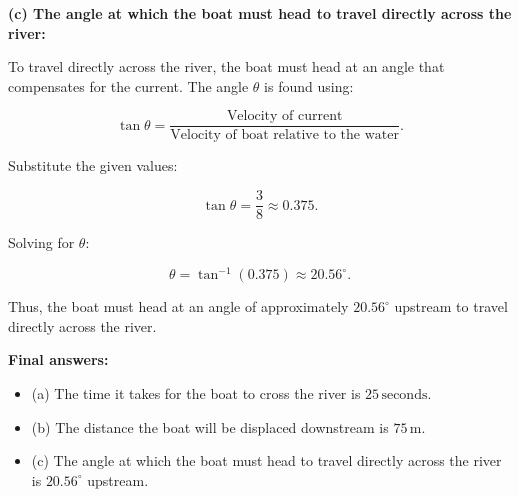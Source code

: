 \documentclass[addpoints]{exam}
\begin{document}
\begin{questions}
\begin{solution}[5cm]
\textbf{(c) The angle at which the boat must head to travel directly across the river:}

To travel directly across the river, the boat must head at an angle that compensates for the current. The angle \( \theta \) is found using:

\[
\tan \theta = \frac{\text{Velocity of current}}{\text{Velocity of boat relative to the water}}.
\]

Substitute the given values:

\[
\tan \theta = \frac{3}{8} \approx 0.375.
\]

Solving for \( \theta \):

\[
\theta = \tan^{-1}(0.375) \approx 20.56^\circ.
\]

Thus, the boat must head at an angle of approximately \( 20.56^\circ \) upstream to travel directly across the river.

\textbf{Final answers:}
\begin{itemize}
    \item (a) The time it takes for the boat to cross the river is \( 25 \, \text{seconds} \).
    \item (b) The distance the boat will be displaced downstream is \( 75 \, \text{m} \).
    \item (c) The angle at which the boat must head to travel directly across the river is \( 20.56^\circ \) upstream.
\end{itemize}
\end{solution}

\end{questions}
\end{document}
